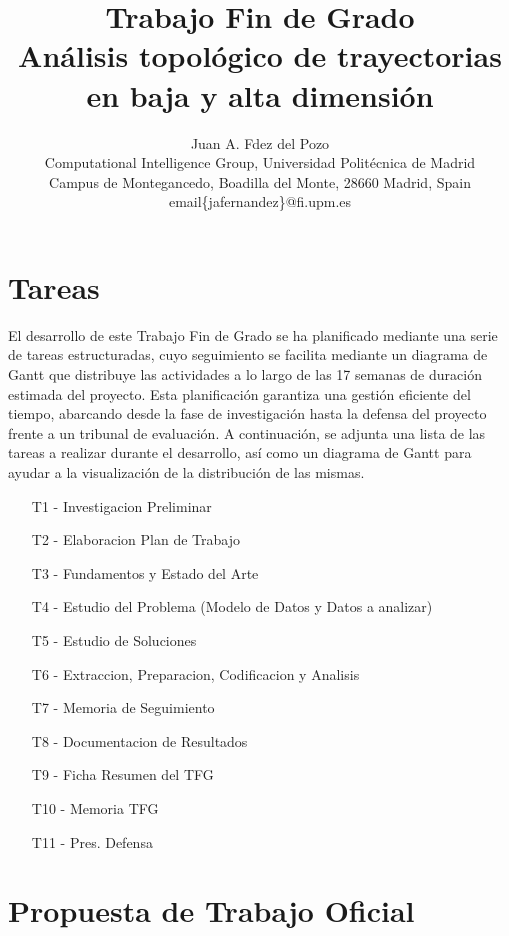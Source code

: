 \chapter*{Tareas}

El desarrollo de este Trabajo Fin de Grado se ha planificado mediante una serie de tareas estructuradas, cuyo seguimiento se facilita mediante un diagrama de Gantt que distribuye las actividades a lo largo de las 17 semanas de duración estimada del proyecto. Esta planificación garantiza una gestión eficiente del tiempo, abarcando desde la fase de investigación hasta la defensa del proyecto frente a un tribunal de evaluación. A continuación, se adjunta una lista de las tareas a realizar durante el desarrollo, así como un diagrama de Gantt para ayudar a la visualización de la distribución de las mismas.

\begin{enumerate}
    \item[T1 -] Investigacion Preliminar
    \item[T2 -] Elaboracion Plan de Trabajo
    \item[T3 -] Fundamentos y Estado del Arte
    \item[T4 -] Estudio del Problema (Modelo de Datos y Datos a analizar)
    \item[T5 -] Estudio de Soluciones
    \item[T6 -] Extraccion, Preparacion, Codificacion y Analisis
    \item[T7 -] Memoria de Seguimiento
    \item[T8 -] Documentacion de Resultados
    \item[T9 -] Ficha Resumen del TFG
    \item[T10 -] Memoria TFG
    \item[T11 -] Pres. Defensa
\end{enumerate}


\begin{landscape}

\end{landscape}


\chapter*{Propuesta de Trabajo Oficial}


\title{Trabajo Fin de Grado\\ Análisis topológico de trayectorias en baja y alta dimensión}

\author{\large Juan A. Fdez del Pozo\\
  \normalsize Computational Intelligence Group, Universidad Polit\'ecnica de Madrid\\
  \normalsize Campus de Montegancedo, Boadilla del Monte, 28660 Madrid, Spain
email{\{jafernandez\}@fi.upm.es}\\
\date{}}

